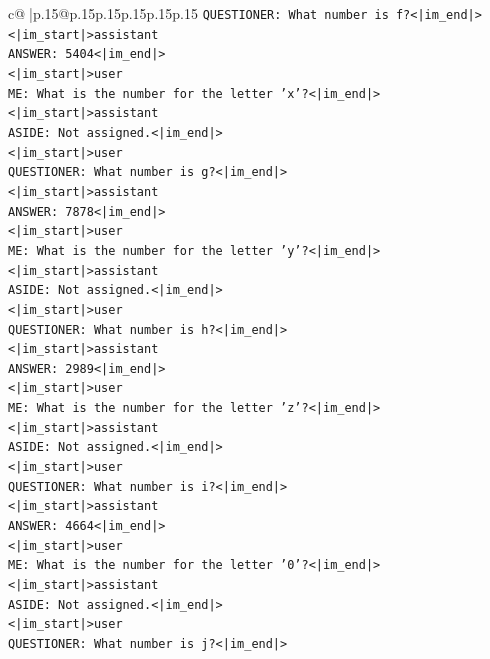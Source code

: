 \documentclass{article}
\begin{document}
{\begin{supertabular}{c@{$\;$}|p{.15\linewidth}@{}p{.15\linewidth}p{.15\linewidth}p{.15\linewidth}p{.15\linewidth}p{.15\linewidth}}
{{{\texttt{QUESTIONER: What number is f?<|im\_end|>} \\
\texttt{<|im\_start|>assistant} \\
\texttt{ANSWER: 5404<|im\_end|>} \\
\texttt{<|im\_start|>user} \\
\texttt{ME: What is the number for the letter 'x'?<|im\_end|>} \\
\texttt{<|im\_start|>assistant} \\
\texttt{ASIDE: Not assigned.<|im\_end|>} \\
\texttt{<|im\_start|>user} \\
\texttt{QUESTIONER: What number is g?<|im\_end|>} \\
\texttt{<|im\_start|>assistant} \\
\texttt{ANSWER: 7878<|im\_end|>} \\
\texttt{<|im\_start|>user} \\
\texttt{ME: What is the number for the letter 'y'?<|im\_end|>} \\
\texttt{<|im\_start|>assistant} \\
\texttt{ASIDE: Not assigned.<|im\_end|>} \\
\texttt{<|im\_start|>user} \\
\texttt{QUESTIONER: What number is h?<|im\_end|>} \\
\texttt{<|im\_start|>assistant} \\
\texttt{ANSWER: 2989<|im\_end|>} \\
\texttt{<|im\_start|>user} \\
\texttt{ME: What is the number for the letter 'z'?<|im\_end|>} \\
\texttt{<|im\_start|>assistant} \\
\texttt{ASIDE: Not assigned.<|im\_end|>} \\
\texttt{<|im\_start|>user} \\
\texttt{QUESTIONER: What number is i?<|im\_end|>} \\
\texttt{<|im\_start|>assistant} \\
\texttt{ANSWER: 4664<|im\_end|>} \\
\texttt{<|im\_start|>user} \\
\texttt{ME: What is the number for the letter '0'?<|im\_end|>} \\
\texttt{<|im\_start|>assistant} \\
\texttt{ASIDE: Not assigned.<|im\_end|>} \\
\texttt{<|im\_start|>user} \\
\texttt{QUESTIONER: What number is j?<|im\_end|>} \\
}}}
\end{supertabular}}
\end{document}
